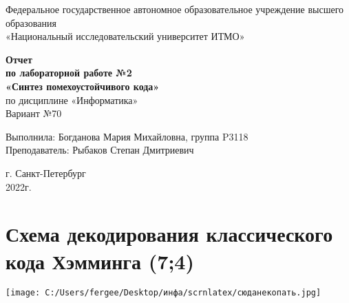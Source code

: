 \documentclass[a4paper]{article}
\begin{document}
\begin{center}
    Федеральное государственное автономное образовательное учреждение высшего образования\\
	«Национальный исследовательский университет ИТМО»
\end{center}
\vspace{1cm}


\begin{center}
    \large \textbf{Отчет}\\
    \textbf{по лабораторной работе №2}\\
    \large \textbf{«Синтез помехоустойчивого кода»}\\
     по дисциплине «Информатика»\\
	\vspace{1cm}
    Вариант №70\\
\end{center}

\vspace{10cm}
\begin{flushright}
  Выполнила: Богданова Мария Михайловна, группа P3118\\
  Преподаватель: Рыбаков Степан Дмитриевич\\
\end{flushright}

\vspace{1cm}
\begin{center}
    г. Санкт-Петербург\\
    2022г.
\end{center}
\newpage
\tableofcontents
\newpage
\section{Схема декодирования классического кода Хэмминга (7;4)}
\texttt{[image: C:/Users/fergee/Desktop/инфа/scrnlatex/сюданекопать.jpg]}
\newpage
\end{document}

